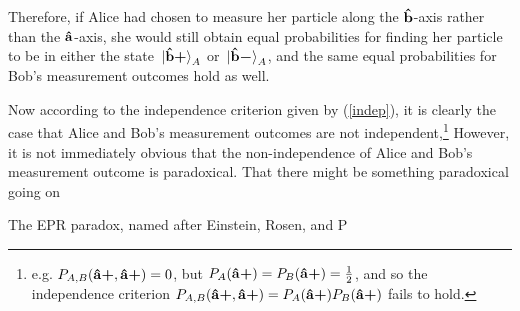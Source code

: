 Therefore, if Alice had chosen to measure her particle along the $\vb{\hat{{b}}}$-axis rather than the $\vb{\hat{{a}}}$-axis, she would still obtain equal probabilities for finding her particle to be in either the state $\ket*{\vb{\hat{{b}}}\bm{+}}_A$ or $\ket*{\vb{\hat{{b}}}\bm{-}}_A$, and the same equal probabilities for Bob's measurement outcomes hold as well.

Now according to the independence criterion given by (\ref{indep}), it is clearly the case that Alice and Bob's measurement outcomes are not independent,\footnote{e.g. $P_{A,B}(\vb{\hat{{a}}}\bm{+},\vb{\hat{{a}}}\bm{+})=0$, but  $P_{A}(\vb{\hat{{a}}}\bm{+})=P_{B}(\vb{\hat{{a}}}\bm{+})=\frac{1}{2}$, and so the independence criterion $P_{A,B}(\vb{\hat{{a}}}\bm{+},\vb{\hat{{a}}}\bm{+})=P_{A}(\vb{\hat{{a}}}\bm{+})P_{B}(\vb{\hat{{a}}}\bm{+})$ fails to hold.} However, it is not immediately obvious that the non-independence of Alice and Bob's measurement outcome is paradoxical. That there might be something paradoxical going on 


The EPR paradox, named after Einstein, Rosen, and P
